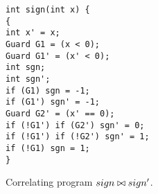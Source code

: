 \begin{figure}
\centering
\begin{lstlisting}
int sign(int x) {
{
int x' = x;
Guard G1 = (x < 0);
Guard G1' = (x' < 0);
int sgn;
int sgn';
if (G1) sgn = -1;
if (G1') sgn' = -1;
Guard G2' = (x' == 0);
if (!G1') if (G2') sgn' = 0;
if (!G1') if (!G2') sgn' = 1;
if (!G1) sgn = 1;
}
\end{lstlisting}
\caption{Correlating program $sign \bowtie sign'$.}
\end{figure}
